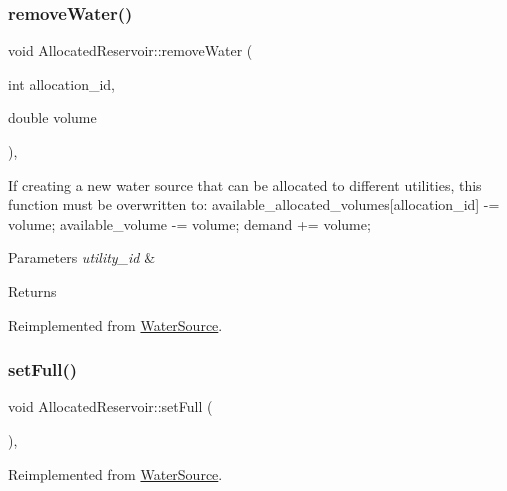 \subsubsection{\texorpdfstring{remove\+Water()}{removeWater()}}
{\footnotesize\ttfamily void Allocated\+Reservoir\+::remove\+Water (\begin{DoxyParamCaption}\item[{int}]{allocation\+\_\+id,  }\item[{double}]{volume }\end{DoxyParamCaption})\hspace{0.3cm}{\ttfamily [override]}, {\ttfamily [virtual]}}

If creating a new water source that can be allocated to different utilities, this function must be overwritten to\+: available\+\_\+allocated\+\_\+volumes\mbox{[}allocation\+\_\+id\mbox{]} -\/= volume; available\+\_\+volume -\/= volume; demand += volume; 
\begin{DoxyParams}{Parameters}
{\em utility\+\_\+id} & \\
\hline
\end{DoxyParams}
\begin{DoxyReturn}{Returns}

\end{DoxyReturn}


Reimplemented from \mbox{\hyperlink{classWaterSource_ab697c3a0765d445f72533f6a5f139bd9}{Water\+Source}}.

\mbox{\label{classAllocatedReservoir_aea294cbca1e1630a1307072632d14b05}} 
\subsubsection{\texorpdfstring{set\+Full()}{setFull()}}
{\footnotesize\ttfamily void Allocated\+Reservoir\+::set\+Full (\begin{DoxyParamCaption}{ }\end{DoxyParamCaption})\hspace{0.3cm}{\ttfamily [override]}, {\ttfamily [virtual]}}



Reimplemented from \mbox{\hyperlink{classWaterSource_a5f8007eb1ae604cfaa67ebb4c0c46eb1}{Water\+Source}}.

\mbox{\label{classAllocatedReservoir_a739d93f7981f597a3db0a3d613304b8e}} 
